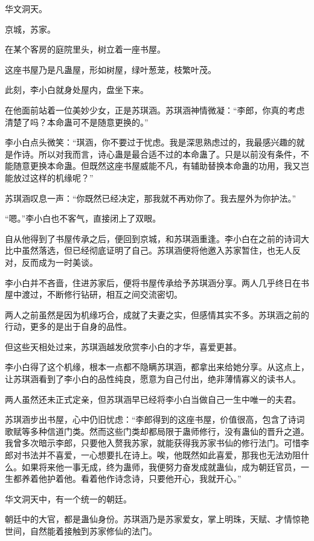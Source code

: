 
\begin{this_body}

华文洞天。

京城，苏家。

在某个客房的庭院里头，树立着一座书屋。

这座书屋乃是凡蛊屋，形如树屋，绿叶葱茏，枝繁叶茂。

此刻，李小白就身处屋内，盘坐下来。

在他面前站着一位美妙少女，正是苏琪涵。苏琪涵神情微凝：“李郎，你真的考虑清楚了吗？本命蛊可不是随意更换的。”

李小白点头微笑：“琪涵，你不要过于忧虑。我是深思熟虑过的，我最感兴趣的就是作诗。所以对我而言，诗心蛊是最合适不过的本命蛊了。只是以前没有条件，不能随意更换本命蛊。但既然这座书屋威能不凡，有辅助替换本命蛊的功用，我又岂能放过这样的机缘呢？”

苏琪涵叹息一声：“你既然已经决定，那我就不再劝你了。我去屋外为你护法。”

“嗯。”李小白也不客气，直接闭上了双眼。

自从他得到了书屋传承之后，便回到京城，和苏琪涵重逢。李小白在之前的诗词大比中虽然落选，但已经彻底证明了自己。苏琪涵便将他邀入苏家暂住，也无人反对，反而成为一时美谈。

李小白并不吝啬，住进苏家后，便将书屋传承给予苏琪涵分享。两人几乎终日在书屋中渡过，不断修行钻研，相互之间交流密切。

两人之前虽然是因为机缘巧合，成就了夫妻之实，但感情其实不多。苏琪涵之前的行动，更多的是出于自身的品性。

但这些天相处过来，苏琪涵越发欣赏李小白的才华，喜爱更甚。

李小白得了这个机缘，根本一点都不隐瞒苏琪涵，都拿出来给她分享。从这点上，让苏琪涵看到了李小白的品性纯良，愿意为自己付出，绝非薄情寡义的读书人。

两人虽然还未正式定亲，但苏琪涵早已经将李小白当做自己一生中唯一的夫君。

苏琪涵步出书屋，心中仍旧忧虑：“李郎得到的这座书屋，价值很高，包含了诗词歌赋等多种信道门类。然而这些门类却都局限于蛊师修行，没有蛊仙的晋升之道。我曾多次暗示李郎，只要他入赘我苏家，就能获得我苏家书仙的修行法门。可惜李郎对书法并不喜爱，一心想要扎在诗上。唉，他既然如此喜爱，那我也无法劝阻什么。如果将来他一事无成，终为蛊师，我便努力奋发成就蛊仙，成为朝廷官员，一生都养着他护着他。看着他作诗念诗，只要他开心，我就开心。”

华文洞天中，有一个统一的朝廷。

朝廷中的大官，都是蛊仙身份。苏琪涵乃是苏家爱女，掌上明珠，天赋、才情惊艳世间，自然能着接触到苏家修仙的法门。


\end{this_body}
